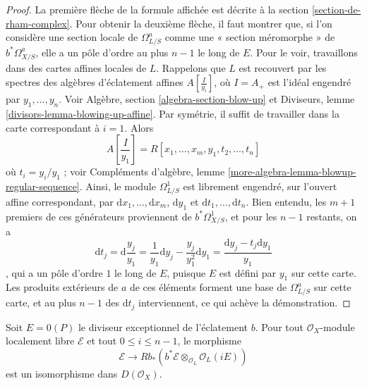 \begin{proof}
La première flèche de la formule affichée est
décrite à la section \ref{section-de-rham-complex}.
Pour obtenir la deuxième flèche, il faut montrer que, si l'on considère
une section locale de $\Omega^a_{L/S}$ comme une « section méromorphe »
de $b^*\Omega^a_{X/S}$, elle a un pôle d'ordre au plus
$n - 1$ le long de $E$.
Pour le voir, travaillons dans des cartes affines locales
de $L$. Rappelons que $L$ est recouvert par les spectres des
algèbres d'éclatement affines $A[\frac{I}{y_i}]$, où $I = A_{+}$
est l'idéal engendré par $y_1, \ldots, y_n$. Voir
Algèbre, section \ref{algebra-section-blow-up} et
Diviseurs, lemme \ref{divisors-lemma-blowing-up-affine}.
Par symétrie, il suffit de travailler dans la
carte correspondant à $i = 1$. Alors
$$
A[\frac{I}{y_1}] = R[x_1, \ldots, x_m, y_1, t_2, \ldots, t_n]
$$
où $t_i = y_i/y_1$ ; voir
Compléments d'algèbre, lemme \ref{more-algebra-lemma-blowup-regular-sequence}.
Ainsi, le module $\Omega^1_{L/S}$ est librement engendré, sur l'ouvert
affine correspondant, par
$\text{d}x_1, \ldots, \text{d}x_m$, $\text{d}y_1$ et
$\text{d}t_1, \ldots, \text{d}t_n$.
Bien entendu, les $m + 1$ premiers de ces générateurs proviennent de
$b^*\Omega^1_{X/S}$, et pour les $n - 1$ restants, on a
$$
\text{d}t_j =
\text{d}\frac{y_j}{y_1} =
\frac{1}{y_1}\text{d}y_j - \frac{y_j}{y_1^2}\text{d}y_1 =
\frac{\text{d}y_j - t_j \text{d}y_1}{y_1}
$$,
qui a un pôle d'ordre $1$ le long de $E$, puisque $E$ est défini par $y_1$
sur cette carte. Les produits extérieurs de $a$ de ces éléments forment une base
de $\Omega^a_{L/S}$ sur cette carte, et au plus
$n - 1$ des $\text{d}t_j$ interviennent, ce qui achève la démonstration.
\end{proof}

\begin{lemma}
\label{lemma-blowup-twist-same-cohomology}
Soit $E = 0(P)$ le diviseur exceptionnel de l'éclatement $b$.
Pour tout $\mathcal{O}_X$-module localement libre $\mathcal{E}$ et
tout $0 \leq i \leq n - 1$, le morphisme
$$
\mathcal{E}
\longrightarrow
Rb_*(b^*\mathcal{E} \otimes_{\mathcal{O}_L} \mathcal{O}_L(iE))
$$
est un isomorphisme dans $D(\mathcal{O}_X)$.
\end{lemma}

